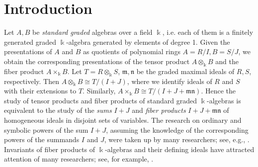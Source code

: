 \documentclass{amsart}
\newcommand{\mm}{\mathfrak{m}}
\newcommand{\nn}{\mathfrak{n}}
\theoremstyle{plain}
\theoremstyle{definition}
\numberwithin{equation}{section}
\newcommand{\kk}{\Bbbk}
\begin{document}
\maketitle


\section{Introduction}
Let $A, B$ be \emph{standard graded} algebras over a field $\kk$, i.e. each of them is a finitely generated graded $\kk$-algebra generated by elements of degree 1. Given the presentations of $A$ and $B$ as quotients of polynomial rings $A=R/I, B=S/J$, we obtain the corresponding presentations of the tensor product $A\otimes_\kk B$ and the fiber product $A\times_\kk B$. Let $T=R\otimes_\kk S$, $\mm, \nn$ be the graded maximal ideals of $R,S$, respectively. Then $A\otimes_\kk B \cong T/(I+J)$, where we identify ideals of $R$ and $S$ with their extensions to $T$. Similarly, $A\times_\kk B\cong T/(I+J+\mm \nn)$. Hence the study of tensor products and fiber products of standard graded $\kk$-algebras is equivalent to the study of the \emph{sums} $I+J$ and \emph{fiber products} $I+J+\mm\nn$ of homogeneous ideals in disjoint sets of variables. The research on ordinary and symbolic powers of the sum $I+J$, assuming the knowledge of the corresponding powers of the summands $I$ and $J$, were taken up by many researchers; see, e.g., \cite{BHJT21, HJKN, HTT16, HNTT, NgHo22}. Invariants of fiber products of $\kk$-algebras and their defining ideals have attracted attention of many researchers; see, for example, \cite{AAF12,CR10, DK75, FJP23, G21, Les81,Mo09, NSW17, NgV19b}.
\end{document}
